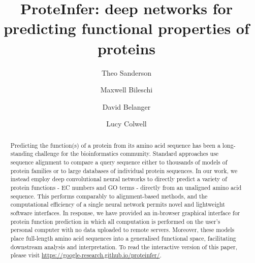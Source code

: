 \title{ProteInfer: deep networks for predicting functional properties of proteins}
\author[*,1,\Letter]{Theo Sanderson}
\author[*,2]{Maxwell Bileschi}
\author[2]{David Belanger}
\author[2]{Lucy Colwell}

\maketitle


\begin{abstract}
Predicting the function(s) of a protein from its amino acid sequence has been a long-standing challenge for the bioinformatics community. Standard approaches use sequence alignment to compare a query sequence either to thousands of models of protein families or to large databases of individual protein sequences. In our work, we instead employ deep convolutional neural networks to directly predict a variety of protein functions - EC numbers and GO terms - directly from an unaligned amino acid sequence. This performs comparably to alignment-based methods, and the computational efficiency of a single neural network permits novel and lightweight software interfaces. In response, we have provided an in-browser graphical interface for protein function prediction in which all computation is performed on the user's personal computer with no data uploaded to remote servers. Moreover, these models place full-length amino acid sequences into a generalised functional space, facilitating downstream analysis and interpretation. To read the interactive version of this paper, please visit \url{https://google-research.github.io/proteinfer/}.
\end {abstract}


